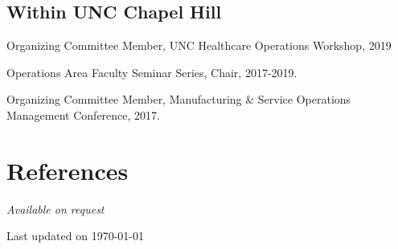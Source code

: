 \documentclass[11pt,a4paper]{article}
\newcommand{\updateinfo}[1][\today]{\par\vfill\hfill{\scriptsize\color{gray}Last updated on #1}}
\renewenvironment{itemize}{
	\begin{list}{}{
			\setlength{\leftmargin}{1.5em}
		}
	}{
\end{list}
}
\begin{document}
	\subsection*{Within UNC Chapel Hill}
	\begin{itemize}
		\item Organizing Committee Member, UNC Healthcare Operations Workshop, 2019
		\item Operations Area Faculty Seminar Series, Chair, 2017-2019.
		\item Organizing Committee Member, Manufacturing \& Service Operations Management Conference, 2017.
	\end{itemize}
\section*{\textbf{References}}
\emph{Available on request}
	\updateinfo[\today]
\end{document}
